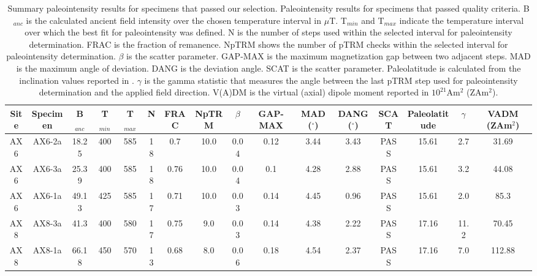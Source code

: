 \documentclass[9pt,twoside,lineno]{pnas-new}
\begin{document}
\begin{table}
\caption{\footnotesize{Summary paleointensity results for specimens that passed our selection. Paleointensity results for specimens that passed quality criteria. B$_{anc}$ is the calculated ancient field intensity over the chosen temperature interval in $\mu$T. T$_{min}$ and T$_{max}$ indicate the temperature interval over which the best fit for paleointensity was defined. N is the number of steps used within the selected interval for paleointensity determination. FRAC is the fraction of remanence. NpTRM shows the number of pTRM checks within the selected interval for paleointensity determination. $\beta$ is the scatter parameter.  GAP-MAX is the maximum magnetization gap between two adjacent steps. MAD is the maximum angle of deviation. DANG is the deviation angle. SCAT is the scatter parameter. Paleolatitude is calculated from the inclination values reported in \cite{Zhang2021b}. $\gamma$ is the gamma statistic that measures the angle between the last pTRM step used for paleointensity determination and the applied field direction. V(A)DM is the virtual (axial) dipole moment reported in $10^{21}$Am$^2$ (ZAm$^2$). }}
\centering
\begin{tabular}{cccccccccccccccc}
\hline
Site & Specimen & B$_{anc}$ & T$_{min}$ & T$_{max}$ & N    & FRAC & NpTRM & $\beta$ & GAP-MAX & MAD ($^\circ$) & DANG ($^\circ$) & SCAT & Paleolatitude & $\gamma$ & VADM (ZAm$^2$) \\
\hline
AX6  & AX6-2a   & 18.25     & 400       & 585       & 18 & 0.7  & 10.0  & 0.04    & 0.12    & 3.44           & 3.43            & PASS & 15.61         & 2.7      & 31.69          \\
AX6  & AX6-3a   & 25.39     & 400       & 585       & 18 & 0.76 & 10.0  & 0.04    & 0.1     & 4.28           & 2.88            & PASS & 15.61         & 3.2      & 44.08          \\
AX6  & AX6-1a   & 49.13     & 425       & 585       & 17 & 0.71 & 10.0  & 0.03    & 0.14    & 4.45           & 0.96            & PASS & 15.61         & 2.0      & 85.3           \\
AX8  & AX8-3a   & 41.3      & 400       & 580       & 17 & 0.75 & 9.0   & 0.03    & 0.14    & 4.38           & 2.22            & PASS & 17.16         & 11.2     & 70.45          \\
AX8  & AX8-1a   & 66.18     & 450       & 570       & 13 & 0.68 & 8.0   & 0.06    & 0.18    & 4.54           & 2.37            & PASS & 17.16         & 7.0      & 112.88         \\

\end{tabular}
\end{table}
\end{document}
